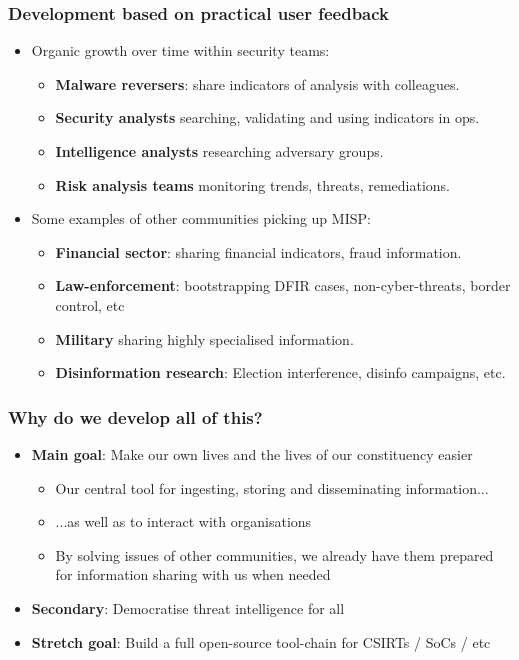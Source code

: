 \begin{frame}
\frametitle{Development based on practical user feedback}
\begin{itemize}
    \item Organic growth over time within security teams:
        \begin{itemize}
                \item {\bf Malware reversers}: share indicators of analysis with colleagues.
                \item {\bf Security analysts} searching, validating and using indicators in ops.
                \item {\bf Intelligence analysts} researching adversary groups.
                \item {\bf Risk analysis teams} monitoring trends, threats, remediations.
        \end{itemize}
    \item Some examples of other communities picking up MISP:
        \begin{itemize}
                \item {\bf Financial sector}: sharing financial indicators, fraud information.
                \item {\bf Law-enforcement}: bootstrapping DFIR cases, non-cyber-threats, border control, etc
                \item {\bf Military} sharing highly specialised information.
                \item {\bf Disinformation research}: Election interference, disinfo campaigns, etc.
        \end{itemize}
\end{itemize}
\end{frame}

        
\begin{frame}
\frametitle{Why do we develop all of this?}      
\begin{itemize}
   \item {\bf Main goal}: Make our own lives and the lives of our constituency easier
   \begin{itemize}
       \item Our central tool for ingesting, storing and disseminating information...
       \item ...as well as to interact with organisations
       \item By solving issues of other communities, we already have them prepared for information sharing with us when needed
   \end{itemize}
   \item {\bf Secondary}: Democratise threat intelligence for all
   \item {\bf Stretch goal}: Build a full open-source tool-chain for CSIRTs / SoCs / etc
\end{itemize}
\end{frame}

